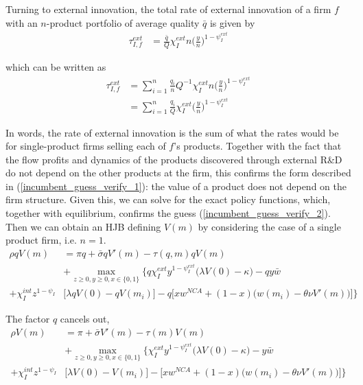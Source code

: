\documentclass[12pt,english]{article}
\theoremstyle{remark}
\begin{document}
Turning to external innovation, the total rate of external innovation of a firm $f$ with an $n$-product portfolio of average quality $\bar{q}$ is given by
\begin{align}
\tau_{I,f}^{ext} &= \frac{\bar{q}}{Q} \chi_I^{ext} n \Big(\frac{y}{n}\Big)^{1-\psi_I^{ext}}   
\end{align}

which can be written as
\begin{align}
\tau_{I,f}^{ext} &=  \sum_{i = 1}^n \frac{q_i}{n} Q^{-1} \chi_I^{ext} n \Big(\frac{y}{n}\Big)^{1-\psi_I^{ext}}  \\
&= \sum_{i = 1}^n \frac{q_i}{Q} \chi_I^{ext} \Big(\frac{y}{n}\Big)^{1-\psi_I^{ext}}  
\end{align}

In words, the rate of external innovation is the sum of what the rates would be for single-product firms selling each of $f$'s products. Together with the fact that the flow profits and dynamics of the products discovered through external R\&D do not depend on the other products at the firm, this confirms the form described in (\ref{incumbent_guess_verify_1}): the value of a product does not depend on the firm structure. Given this, we can solve for the exact policy functions, which, together with equilibrium, confirms the guess (\ref{incumbent_guess_verify_2}). Then we can obtain an HJB defining $V(m)$ by considering the case of a single product firm, i.e. $n = 1$. 
\begin{align}
\rho q V(m) &= \pi q + \bar{\sigma} q V'(m)  - \tau(q,m) q V(m) \nonumber \\ 
& + \max_{z \ge 0, y \ge 0, x \in \{0,1\}} \Bigg\{ q \chi_I^{ext} y^{1-\psi_I^{ext}} \Big( \lambda V(0) - \kappa \Big) - q y \bar{w} \nonumber \\
+  \chi_I^{int} z^{1-\psi_I} &\Bigg[ \lambda q V(0) - q V(m_i) \Bigg] - q \Bigg[ x w^{NCA} + (1-x) \Big( w(m_i) - \theta \nu V'(m)\Big) \Bigg] \Bigg\} \label{HJB_I_singleProductFirm_1}
\end{align}

The factor $q$ cancels out, 
\begin{align}
\rho V(m) &= \pi + \bar{\sigma} V'(m)  - \tau(m) V(m) \nonumber \\ 
& + \max_{z \ge 0, y \ge 0, x \in \{0,1\}} \Bigg\{ \chi_I^{ext} y^{1-\psi_I^{ext}} \Big( \lambda V(0) - \kappa \Big) - y \bar{w} \nonumber \\
+  \chi_I^{int} z^{1-\psi_I} &\Bigg[ \lambda V(0) - V(m_i) \Bigg] - \Bigg[ x w^{NCA} + (1-x) \Big( w(m_i) - \theta \nu V'(m)\Big) \Bigg] \Bigg\} \label{HJB_I_singleProductFirm_2}
\end{align}
\end{document}
